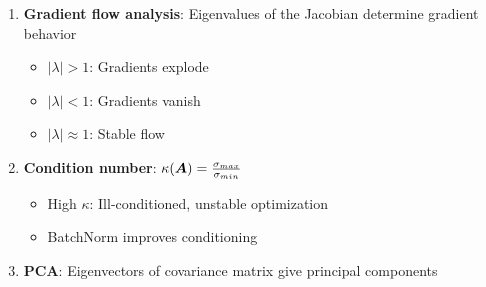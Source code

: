 \begin{enumerate}
    \item \textbf{Gradient flow analysis}: Eigenvalues of the Jacobian determine gradient behavior
    \begin{itemize}
        \item $|\lambda| > 1$: Gradients explode
        \item $|\lambda| < 1$: Gradients vanish
        \item $|\lambda| \approx 1$: Stable flow
    \end{itemize}

    \item \textbf{Condition number}: $\kappa(\bm{A}) = \frac{\sigma_{max}}{\sigma_{min}}$
    \begin{itemize}
        \item High $\kappa$: Ill-conditioned, unstable optimization
        \item BatchNorm improves conditioning
    \end{itemize}

    \item \textbf{PCA}: Eigenvectors of covariance matrix give principal components
\end{enumerate}

